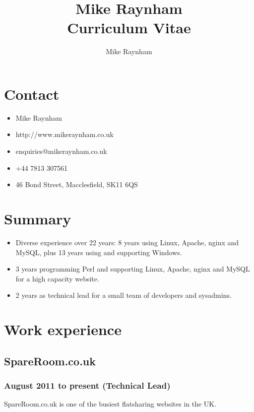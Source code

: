\documentclass[10pt]{article}
\title{Mike Raynham\\Curriculum Vitae}
\author{Mike Raynham}
\begin{document}
\maketitle

\section{Contact}
\begin{itemize}
    \item Mike Raynham
	\item http://www.mikeraynham.co.uk
	\item enquiries@mikeraynham.co.uk
	\item +44 7813 307561
	\item 46 Bond Street, Macclesfield, SK11 6QS
\end{itemize}

\section{Summary}

\begin{itemize}
    \item Diverse experience over 22 years: 8 years using Linux, Apache, nginx and
          MySQL, plus 13 years using and supporting Windows.
    \item 3 years programming Perl and supporting Linux, Apache, nginx and MySQL for
          a high capacity website.
    \item 2 years as technical lead for a small team of developers and sysadmins.
\end{itemize}

\section{Work experience}

\subsection{SpareRoom.co.uk}
\subsubsection{August 2011 to present (Technical Lead)}

SpareRoom.co.uk is one of the busiest flatsharing websites in the UK.
\end{document}
